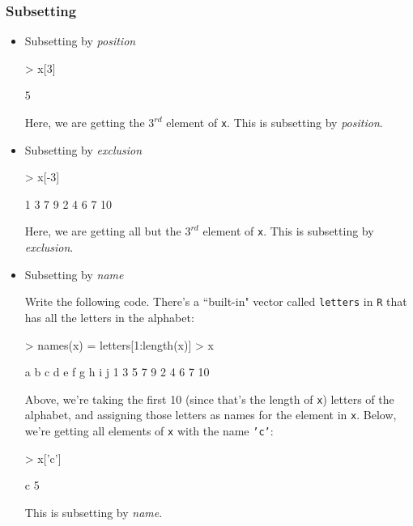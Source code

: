 \documentclass[answers]{exam}
\begin{document}
\subsubsection{Subsetting}
\begin{itemize}
\item Subsetting by \textit{position}

\begin{Schunk}
\begin{Sinput}
> x[3]  
\end{Sinput}
\begin{Soutput}
[1] 5
\end{Soutput}
\end{Schunk}
Here, we are getting the $3^{rd}$ element of \texttt{x}. This is subsetting by \textit{position}.

\item Subsetting by \textit{exclusion}

\begin{Schunk}
\begin{Sinput}
> x[-3]  
\end{Sinput}
\begin{Soutput}
[1]  1  3  7  9  2  4  6  7 10
\end{Soutput}
\end{Schunk}

Here, we are getting all but the $3^{rd}$ element of \texttt{x}. This is subsetting by \textit{exclusion}.

\item Subsetting by \textit{name}

Write the following code. There's a ``built-in" vector called \texttt{letters} in \texttt{R} that has all the letters in the alphabet:
\begin{Schunk}
\begin{Sinput}
> names(x) = letters[1:length(x)]
> x
\end{Sinput}
\begin{Soutput}
 a  b  c  d  e  f  g  h  i  j 
 1  3  5  7  9  2  4  6  7 10 
\end{Soutput}
\end{Schunk}
Above, we're taking the first 10 (since that's the length of \texttt{x}) letters of the alphabet, and assigning those letters as names for the element in \texttt{x}. Below, we're getting all elements of \texttt{x} with the name \texttt{'c'}:

\begin{Schunk}
\begin{Sinput}
> x['c']  
\end{Sinput}
\begin{Soutput}
c 
5 
\end{Soutput}
\end{Schunk}
This is subsetting by \textit{name}.


\end{itemize}
\end{document}
